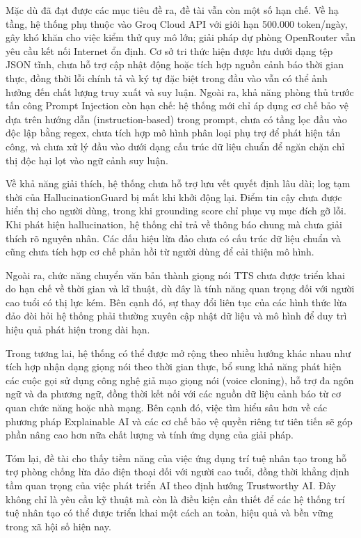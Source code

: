 Mặc dù đã đạt được các mục tiêu đề ra, đề tài vẫn còn một số hạn chế. Về hạ tầng, hệ thống phụ thuộc vào Groq Cloud API với giới hạn 500.000 token/ngày, gây khó khăn cho việc kiểm thử quy mô lớn; giải pháp dự phòng OpenRouter vẫn yêu cầu kết nối Internet ổn định. Cơ sở tri thức hiện được lưu dưới dạng tệp JSON tĩnh, chưa hỗ trợ cập nhật động hoặc tích hợp nguồn cảnh báo thời gian thực, đồng thời lỗi chính tả và ký tự đặc biệt trong đầu vào vẫn có thể ảnh hưởng đến chất lượng truy xuất và suy luận. Ngoài ra, khả năng phòng thủ trước tấn công Prompt Injection còn hạn chế: hệ thống mới chỉ áp dụng cơ chế bảo vệ dựa trên hướng dẫn (instruction-based) trong prompt, chưa có tầng lọc đầu vào độc lập bằng regex, chưa tích hợp mô hình phân loại phụ trợ để phát hiện tấn công, và chưa xử lý đầu vào dưới dạng cấu trúc dữ liệu chuẩn để ngăn chặn chỉ thị độc hại lọt vào ngữ cảnh suy luận.

Về khả năng giải thích, hệ thống chưa hỗ trợ lưu vết quyết định lâu dài; log tạm thời của HallucinationGuard bị mất khi khởi động lại. Điểm tin cậy chưa được hiển thị cho người dùng, trong khi grounding score chỉ phục vụ mục đích gỡ lỗi. Khi phát hiện hallucination, hệ thống chỉ trả về thông báo chung mà chưa giải thích rõ nguyên nhân. Các dấu hiệu lừa đảo chưa có cấu trúc dữ liệu chuẩn và cũng chưa tích hợp cơ chế phản hồi từ người dùng để cải thiện mô hình.

Ngoài ra, chức năng chuyển văn bản thành giọng nói TTS chưa được triển khai do hạn chế về thời gian và kĩ thuật, dù đây là tính năng quan trọng đối với người cao tuổi có thị lực kém. Bên cạnh đó, sự thay đổi liên tục của các hình thức lừa đảo đòi hỏi hệ thống phải thường xuyên cập nhật dữ liệu và mô hình để duy trì hiệu quả phát hiện trong dài hạn.

Trong tương lai, hệ thống có thể được mở rộng theo nhiều hướng khác nhau như tích hợp nhận dạng giọng nói theo thời gian thực, bổ sung khả năng phát hiện các cuộc gọi sử dụng công nghệ giả mạo giọng nói (voice cloning), hỗ trợ đa ngôn ngữ và đa phương ngữ, đồng thời kết nối với các nguồn dữ liệu cảnh báo từ cơ quan chức năng hoặc nhà mạng. Bên cạnh đó, việc tìm hiểu sâu hơn về các phương pháp Explainable AI và các cơ chế bảo vệ quyền riêng tư tiên tiến sẽ góp phần nâng cao hơn nữa chất lượng và tính ứng dụng của giải pháp.

Tóm lại, đề tài cho thấy tiềm năng của việc ứng dụng trí tuệ nhân tạo trong hỗ trợ phòng chống lừa đảo điện thoại đối với người cao tuổi, đồng thời khẳng định tầm quan trọng của việc phát triển AI theo định hướng Trustworthy AI. Đây không chỉ là yêu cầu kỹ thuật mà còn là điều kiện cần thiết để các hệ thống trí tuệ nhân tạo có thể được triển khai một cách an toàn, hiệu quả và bền vững trong xã hội số hiện nay.

